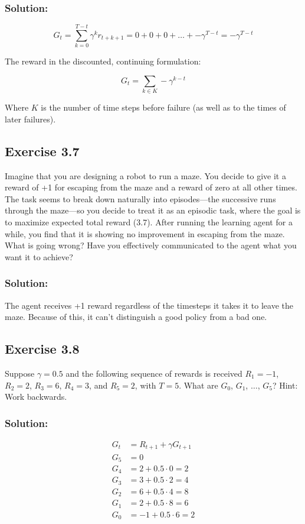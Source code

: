 \subsubsection*{Solution:}

\[
G_t = \sum_{k=0}^{T-t} \gamma^k r_{t+k+1} = 0 + 0 + 0 + \dots + -\gamma^{T-t} = -\gamma^{T-t}
\]

The reward in the discounted, continuing formulation:

\[
G_t = \sum_{k \in K} -\gamma^{k-t}
\]

Where $K$ is the number of time steps before failure (as well as to the times of later failures).


\subsection*{Exercise 3.7} Imagine that you are designing a robot to run a maze. You decide to give it a
reward of +1 for escaping from the maze and a reward of zero at all other times. The task
seems to break down naturally into episodes—the successive runs through the maze—so
you decide to treat it as an episodic task, where the goal is to maximize expected total
reward (3.7). After running the learning agent for a while, you find that it is showing
no improvement in escaping from the maze. What is going wrong? Have you effectively
communicated to the agent what you want it to achieve?

\subsubsection*{Solution:}

The agent receives +1 reward regardless of the timesteps it takes it to leave the maze. Because of this, it can't distinguish a good policy from a bad one.

\subsection*{Exercise 3.8}
Suppose $\gamma = 0.5$ and the following sequence of rewards is received $R_1 = -1$, $R_2 = 2$, $R_3 = 6$, $R_4 = 3$, and $R_5 = 2$, with $T = 5$. What are $G_0$, $G_1$, $\dots$, $G_5$? Hint:
Work backwards.

\subsubsection*{Solution:}

\begin{equation}
    \begin{aligned}
        G_t &= R_{t+1} + \gamma G_{t+1} \\
        G_5 &= 0 \\
        G_4 &= 2 + 0.5 \cdot 0 = 2 \\
        G_3 &= 3 + 0.5 \cdot 2 = 4 \\
        G_2 &= 6 + 0.5 \cdot 4 = 8 \\
        G_1 &= 2 + 0.5 \cdot 8 = 6 \\
        G_0 &= -1 + 0.5 \cdot 6 = 2 \\
    \end{aligned}
\end{equation}


